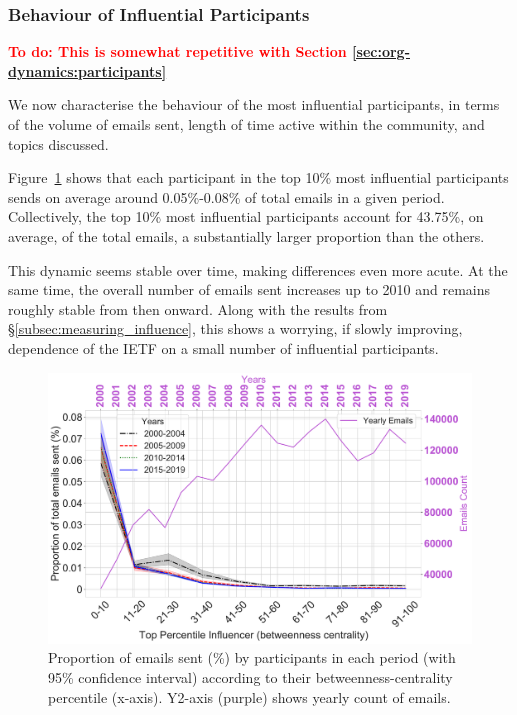 \documentclass[twocolumn,10pt]{article}
\newlength{\figureWidthOneColumn}
\newcommand{\todo}[1]{\textbf{\textcolor{red}{To do: #1}}}
\newcommand{\pb}[1]{\vspace{0.75ex}\noindent{\textbf{#1}}}
\begin{document}
\subsubsection{Behaviour of Influential Participants}
\label{subsec:influencer_behaviour}

\todo{This is somewhat repetitive with Section \ref{sec:org-dynamics:participants}}

We now characterise the behaviour of the most influential participants, in
terms of the volume of emails sent, length of time active within the
community, and topics discussed. 

\pb{Email volume}
Figure~\ref{fig:emailcount_top_percentile} shows that each participant in
the top 10\% most influential participants sends on average around
0.05\%-0.08\% of total emails in a given period.  Collectively, the top
10\% most influential participants account for 43.75\%, on average, of the
total emails, a substantially larger proportion than the others.

This dynamic seems stable over time, making differences even more acute.
At the same time, the overall number of emails sent increases up to 2010
and remains roughly stable from then onward.  Along with the results from
\S\ref{subsec:measuring_influence}, this shows a worrying, if slowly
improving, dependence of the IETF on a small number of influential
participants.

\begin{figure}
  \centering
  \includegraphics[width=\figureWidthOneColumn]{figures-prev/icwsm-2022/lineplot_proportion_emailscount_top_percentile.pdf}
  \caption{
    Proportion of emails sent (\%) by participants in each period (with
    95\% confidence interval) according to their betweenness-centrality
    percentile (x-axis).  Y2-axis (purple) shows yearly count of emails.
  }
  \label{fig:emailcount_top_percentile}
\end{figure}
\end{document}
